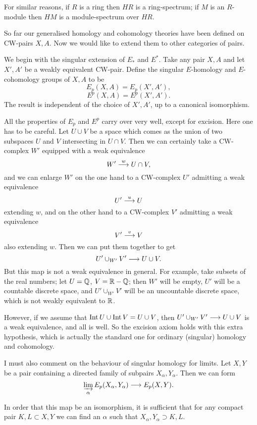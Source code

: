 \documentclass[../main]{subfiles}
\begin{document}
For similar reasons, if $R$ is a ring then $HR$ is a ring-spectrum; if $M$ is an $R$-module then $HM$ is a module-spectrum over $HR$.

So far our generalised homology and cohomology theories have been defined on CW-pairs $X,A$. Now we would like to extend them to other categories of pairs.

We begin with the singular extension of $E_*$ and $E^*$. Take any pair $X,A$ and let $X',A'$ be a weakly equivalent CW-pair. Define the singular $E$-homology and $E$-cohomology groups of $X,A$ to be
\[E_p(X,A) = E_p(X',A'),\]
\[E^p(X,A) = E^p(X',A').\]
The result is independent of the choice of $X',A'$, up to a canonical isomorphism.

All the properties of $E_p$ and $E^p$ carry over very well, except for excision. Here one has to be careful. Let $U \cup V$ be a space which comes as the union of two subspaces $U$ and $V$ intersecting in $U \cap V$. Then we can certainly take a CW-complex $W'$ equipped with a weak equivalence
\[W' \overset{w}{\longrightarrow}U \cap V,\]
and we can enlarge $W'$ on the one hand to a CW-complex $U'$ admitting a weak equivalence 
\[U' \overset{u}{\longrightarrow} U\]
extending $w$, and on the other hand to a CW-complex $V'$ admitting a weak equivalence 
\[V' \overset{v}{\longrightarrow} V\]
also extending $w$. Then we can put them together to get
\[U' \cup_{W'} V' \longrightarrow  U \cup V.\]
But this map is not a weak equivalence in general. For example, take subsets of the real numbers; let $U = \mathbb{Q}$, $V=\mathbb{R} - \mathbb{Q}$; then $W'$ will be empty, $U'$ will be a countable discrete space, and $U' \cup_{W'} V'$ will be an uncountable discrete space, which is not weakly equivalent to $\mathbb{R}$.

However, if we assume that $\mathop{\mathrm{Int}} U \cup \mathop{\mathrm{Int}} V = U \cup V$, then $U' \cup_{W'} V' \longrightarrow U \cup V$ is a weak equivalence, and all is well. So the excision axiom holds with this extra hypothesis, which is actually the standard one for ordinary (singular) homology and cohomology.

I must also comment on the behaviour of singular homology for limits. Let $X,Y$ be a pair containing a directed family of subpairs $X_\alpha,Y_\alpha$. Then we can form
\[\varinjlim_\alpha E_p(X_\alpha,Y_\alpha) \longrightarrow E_p(X,Y).\]
\begin{proposition}\label{prop:p3c10.1}
In order that this map be an isomorphism, it is sufficient that for any compact pair $K,L \subset X,Y$ we can find an $\alpha$ such that $X_\alpha,Y_\alpha \supset K,L$.
\end{proposition}
\end{document}
